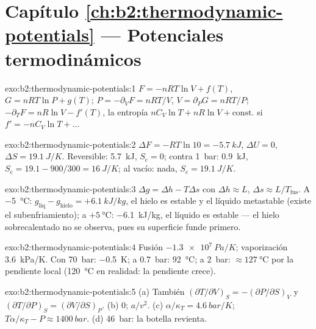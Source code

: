 \section*{Capítulo \ref{ch:b2:thermodynamic-potentials} --- Potenciales termodinámicos}

\begin{solution}{exo:b2:thermodynamic-potentials:1}
$F = -nRT\ln V + f(T)$, $G = nRT\ln P + g(T)$; $P = -\partial_VF = nRT/V$,
$V = \partial_PG = nRT/P$; $-\partial_TF = nR\ln V - f'(T)$, la entropía
$nC_V\ln T + nR\ln V + \text{const.}$ si $f' = -nC_V\ln T + \dots$
\end{solution}

\begin{solution}{exo:b2:thermodynamic-potentials:2}
$\Delta F = -RT\ln 10 = \qty{-5.7}{kJ}$, $\Delta U = 0$, $\Delta S = \qty{19.1}{J/K}$.
Reversible: \qty{5.7}{kJ}, $S_{\text{c}} = 0$; contra \qty{1}{bar}: \qty{0.9}{kJ},
$S_{\text{c}} = 19.1 - 900/300 = \qty{16}{J/K}$; al vacío: nada, $S_{\text{c}} =
\qty{19.1}{J/K}$.
\end{solution}

\begin{solution}{exo:b2:thermodynamic-potentials:3}
$\Delta g = \Delta h - T\Delta s$ con $\Delta h \approx L$, $\Delta s \approx L/T_{\text{fus}}$.
A \qty{-5}{\celsius}: $g_{\text{liq}} - g_{\text{hielo}} = +\qty{6.1}{kJ/kg}$, el hielo es
estable y el líquido metastable (existe el subenfriamiento); a $+\qty{5}{\celsius}$:
\qty{-6.1}{kJ/kg}, el líquido es estable --- el hielo sobrecalentado no se observa, pues su
superficie funde primero.
\end{solution}

\begin{solution}{exo:b2:thermodynamic-potentials:4}
Fusión $\qty{-1.3e7}{Pa/K}$; vaporización \qty{3.6}{kPa/K}. Con \qty{70}{bar}:
\qty{-0.5}{K}; a \qty{0.7}{bar}: \qty{92}{\celsius}; a \qty{2}{bar}: $\approx
\qty{127}{\celsius}$ por la pendiente local (\qty{120}{\celsius} en realidad: la
pendiente crece).
\end{solution}

\begin{solution}{exo:b2:thermodynamic-potentials:5}
(a) También $(\partial T/\partial V)_S = -(\partial P/\partial S)_V$ y
$(\partial T/\partial P)_S = (\partial V/\partial S)_P$. (b) $0$; $a/v^2$. (c)
$\alpha/\kappa_T = \qty{4.6}{bar/K}$; $T\alpha/\kappa_T - P \approx \qty{1400}{bar}$.
(d) \qty{46}{bar}: la botella revienta.
\end{solution}

